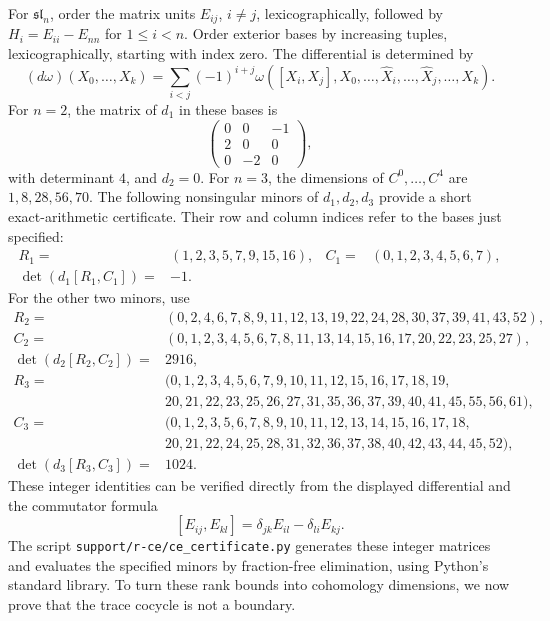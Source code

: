 \documentclass[11pt]{article}
\numberwithin{equation}{section}
\theoremstyle{definition}
\theoremstyle{remark}
\begin{document}
For $\mathfrak{sl}_n$, order the matrix units $E_{ij}$, $i\ne j$,
lexicographically, followed by $H_i=E_{ii}-E_{nn}$ for $1\le i<n$.
Order exterior bases by increasing tuples, lexicographically, starting
with index zero.  The differential is determined by
\[
 (d\omega)(X_0,\ldots,X_k)=
 \sum_{i<j}(-1)^{i+j}
 \omega([X_i,X_j],X_0,\ldots,\widehat X_i,\ldots,
                         \widehat X_j,\ldots,X_k).
\]
For $n=2$, the matrix of $d_1$ in these bases is
\[
 \begin{pmatrix}0&0&-1\\2&0&0\\0&-2&0\end{pmatrix},
\]
with determinant $4$, and $d_2=0$.  For $n=3$, the dimensions of
$C^0,\ldots,C^4$ are $1,8,28,56,70$.  The following nonsingular
minors of $d_1,d_2,d_3$ provide a short exact-arithmetic certificate.
Their row and column indices refer to the bases just specified:
\begin{align*}
 R_1={}&(1,2,3,5,7,9,15,16),&
 C_1={}&(0,1,2,3,4,5,6,7),\\
 \det(d_1[R_1,C_1])={}&-1.&&
\end{align*}
For the other two minors, use
\begin{align*}
 R_2={}&(0,2,4,6,7,8,9,11,12,13,19,22,24,28,30,37,39,41,43,52),\\
 C_2={}&(0,1,2,3,4,5,6,7,8,11,13,14,15,16,17,20,22,23,25,27),\\
 \det(d_2[R_2,C_2])={}&2916,
\end{align*}
\begin{align*}
 R_3={}&(0,1,2,3,4,5,6,7,9,10,11,12,15,16,17,18,19,\\
       & 20,21,22,23,25,26,27,31,35,36,37,39,40,41,45,55,56,61),\\
 C_3={}&(0,1,2,3,5,6,7,8,9,10,11,12,13,14,15,16,17,18,\\
       & 20,21,22,24,25,28,31,32,36,37,38,40,42,43,44,45,52),\\
 \det(d_3[R_3,C_3])={}&1024.
\end{align*}
These integer identities can be verified directly from the displayed
differential and the commutator formula
\[
 [E_{ij},E_{kl}]=\delta_{jk}E_{il}-\delta_{li}E_{kj}.
\]
The script \texttt{support/r-ce/ce\_certificate.py} generates these
integer matrices and evaluates the specified minors by fraction-free
elimination, using Python's standard library. To turn these rank bounds
into cohomology dimensions, we now prove that the trace cocycle is not
a boundary.
\end{document}
